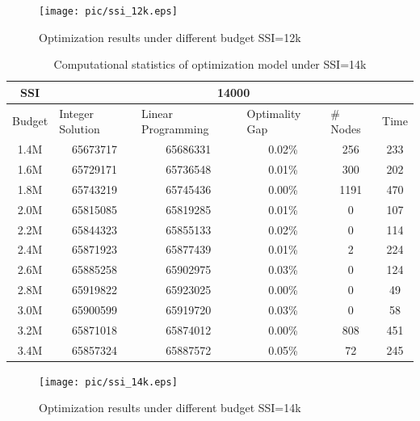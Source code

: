 \documentclass[12pt,english]{report}
\begin{document}
\begin{figure}[ht]
    \centering
    \texttt{[image: pic/ssi\_12k.eps]}
    \caption{Optimization results under different budget SSI=12k }
     \label{ssi_12k_plot}
\end{figure}




\begin{table}[ht]
\centering
\caption{Computational statistics of optimization model under SSI=14k}
\label{ssi14k}
\begin{tabular}{|c|c|c|c|c|c|}
\hline
SSI     & \multicolumn{5}{c|}{14000}                      
\\ \hline
\multicolumn{1}{|l|}{Budget} & \multicolumn{1}{l|}{Integer Solution} &
\multicolumn{1}{l|}{Linear Programming} & \multicolumn{1}{l|}{Optimality Gap} &
\multicolumn{1}{l|}{\# Nodes} & \multicolumn{1}{l|}{Time} \\
\hline
1.4M    & 65673717     & 65686331
& 0.02\%       & 256    &233                \\ \hline
1.6M   & 65729171  & 65736548
& 0.01\%   & 300     &202                    \\ \hline
1.8M   & 65743219   & 65745436
& 0.00\%       & 1191   & 470                \\ \hline
2.0M  & 65815085   & 65819285
& 0.01\%   & 0  & 107                        \\ \hline
2.2M   & 65844323   & 65855133
& 0.02\%     & 0  & 114                      \\ \hline
2.4M   & 65871923   & 65877439
& 0.01\%     & 2   & 224                     \\ \hline
2.6M      & 65885258     & 65902975
& 0.03\%     & 0       & 124                 \\ \hline
2.8M   & 65919822      & 65923025
& 0.00\%   & 0      & 49                     \\ \hline
3.0M    & 65900599    & 65919720
& 0.03\%   & 0    & 58                       \\ \hline
3.2M  & 65871018    & 65874012
& 0.00\%  & 808    & 451                     \\ \hline
3.4M      & 65857324     & 65887572
& 0.05\%   & 72    & 245                     \\ \hline
\end{tabular}
\end{table}




\begin{figure}[ht]
    \centering
    \texttt{[image: pic/ssi\_14k.eps]}
    \caption{Optimization results under different budget SSI=14k }
     \label{ssi_14k_plot}
\end{figure}
\end{document}
